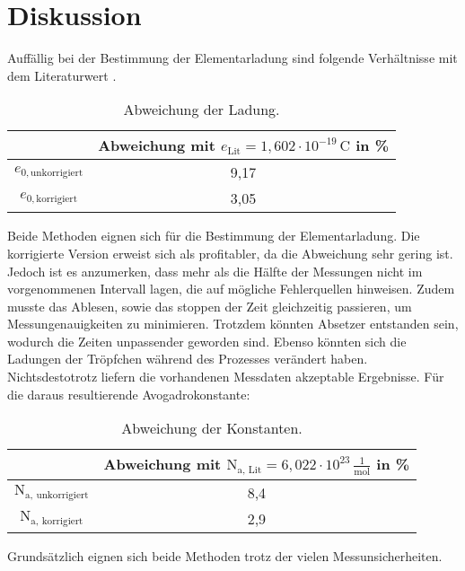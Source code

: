 \section{Diskussion}

\begin{flushleft}
    Auffällig bei der Bestimmung der Elementarladung sind folgende Verhältnisse mit dem Literaturwert \cite{a3}.
\end{flushleft}

\begin{table}[H]
    \centering
    \caption{Abweichung der Ladung.}
    \label{Tabelle4}
    \begin{tabular} {c  c}
        \toprule
        {} &
        {Abweichung mit $e_{\text{Lit}} = 1,602 \cdot 10^{-19}\,\unit{\coulomb}$ in \%} \\
        \midrule
        $e_{0, \text{unkorrigiert}}$ & 9,17\\
        $e_{0, \text{korrigiert}}$ & 3,05\\
        \bottomrule
    \end{tabular} 
\end{table}

\begin{flushleft}
    Beide Methoden eignen sich für die Bestimmung der Elementarladung.
    Die korrigierte Version erweist sich als profitabler, da die Abweichung sehr gering ist.
    Jedoch ist es anzumerken, dass mehr als die Hälfte der Messungen nicht im vorgenommenen Intervall lagen, die auf mögliche Fehlerquellen hinweisen.
    Zudem musste das Ablesen, sowie das stoppen der Zeit gleichzeitig passieren, um Messungenauigkeiten zu minimieren.
    Trotzdem könnten Absetzer entstanden sein, wodurch die Zeiten unpassender geworden sind.
    Ebenso könnten sich die Ladungen der Tröpfchen während des Prozesses verändert haben.
    Nichtsdestotrotz liefern die vorhandenen Messdaten akzeptable Ergebnisse. 
    Für die daraus resultierende Avogadrokonstante:
\end{flushleft}

\begin{table}[H]
    \centering
    \caption{Abweichung der Konstanten.}
    \label{Tabelle5}
    \begin{tabular} {c  c}
        \toprule
        {} &
        {Abweichung mit $\text{N}_{\text{a, Lit}} = 6,022 \cdot 10^{23}\,\frac{1}{\text{mol}}$ \cite{a2} in \%} \\
        \midrule
        $\text{N}_{\text{a, unkorrigiert}}$ & 8,4\\
        $\text{N}_{\text{a, korrigiert}}$   & 2,9\\
        \bottomrule
    \end{tabular} 
\end{table}

\begin{flushleft}
    Grundsätzlich eignen sich beide Methoden trotz der vielen Messunsicherheiten.
\end{flushleft}